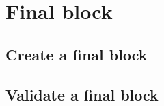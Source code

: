 \documentclass[../hydrozoa.tex]{subfiles}
\begin{document}


\section{Final block}%
\label{h:l2-final-block}%


\subsection{Create a final block}%
\label{h:l2-final-block-create}%


\subsection{Validate a final block}%
\label{h:l2-final-block-validate}%

\end{document}
